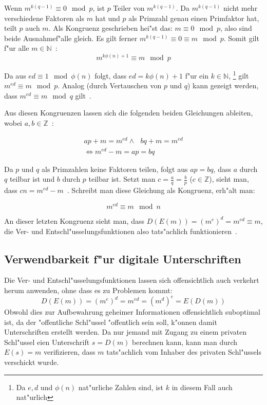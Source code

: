 \documentclass[12pt]{article}
\begin{document}
Wenn $m^{k(q-1)} \equiv 0 \mod p$, ist $p$ Teiler von $m^{k(q-1)}$.
Da $m^{k(q-1)}$ nicht mehr verschiedene Faktoren als $m$ hat und $p$ als Primzahl
genau einen Primfaktor hat, teilt $p$ auch $m$.
Als Kongruenz geschrieben hei"st das: $m \equiv 0 \mod p$, also sind beide Ausnahmef"alle gleich.
Es gilt ferner $m^{k(q-1)} \equiv 0 \equiv m \mod p$.
Somit gilt f"ur alle $m \in \mathbb{N}$~\cite{rsa}:
\[m^{k\phi(n)+1} \equiv m \mod p\]

Da aus $ed \equiv 1 \mod \phi(n)$ folgt, dass $ed = k\phi(n) +1$ f"ur ein $k \in \mathbb{N}$,%
\footnote{Da $e, d$ und $\phi(n)$ nat"urliche Zahlen sind, ist $k$ in diesem Fall auch nat"urlich}
gilt $m^{ed} \equiv m \mod p$.
Analog (durch Vertauschen von $p$ und $q$) kann gezeigt werden,
dass $m^{ed} \equiv m \mod q$ gilt~\cite{rsa}.

Aus diesen Kongruenzen lassen sich die folgenden beiden Gleichungen ableiten,
wobei $a, b \in \mathbb{Z}$~\cite{pii1}:

\[
\begin{aligned}
ap + m = m^{ed} \land ~~~ bq + m = m^{ed} \\
\iff m^{ed} - m = ap = bq
\end{aligned}
\]

Da $p$ und $q$ als Primzahlen keine Faktoren teilen, folgt aus $ap = bq$,
dass $a$ durch $q$ teilbar ist und $b$ durch $p$ teilbar ist.
Setzt man $c = \frac{a}{q} = \frac{b}{p}$ ($c \in \mathbb{Z}$),
sieht man, dass $cn = m^{ed} - m$~\cite{pii1}.
Schreibt man diese Gleichung als Kongruenz, erh"alt man:

\[
m^{ed} \equiv m \mod n
\]

An dieser letzten Kongruenz sieht man, dass $D(E(m)) = (m^e)^d = m^{ed} \equiv m$,
die Ver- und Entschl"usselungsfunktionen also tats"achlich funktionieren~\cite{rsa}.

\subsection{Verwendbarkeit f"ur digitale Unterschriften}

Die Ver- und Entschl"usselungsfunktionen lassen sich offensichtlich
auch verkehrt herum anwenden, ohne dass es zu Problemen kommt:
\[D(E(m)) = (m^e)^d = m^{ed} = (m^d)^e = E(D(m))\]
Obwohl dies zur Aufbewahrung geheimer Informationen offensichtlich suboptimal ist,
da der "offentliche Schl"ussel "offentlich sein soll, k"onnen damit Unterschriften erstellt werden.
Da nur jemand mit Zugang zu einem privaten Schl"ussel eien Unterschrift $s = D(m)$ berechnen kann,
kann man durch $E(s) = m$ verifizieren, dass $m$ tats"achlich vom
Inhaber des privaten Schl"ussels verschickt wurde.
\end{document}
